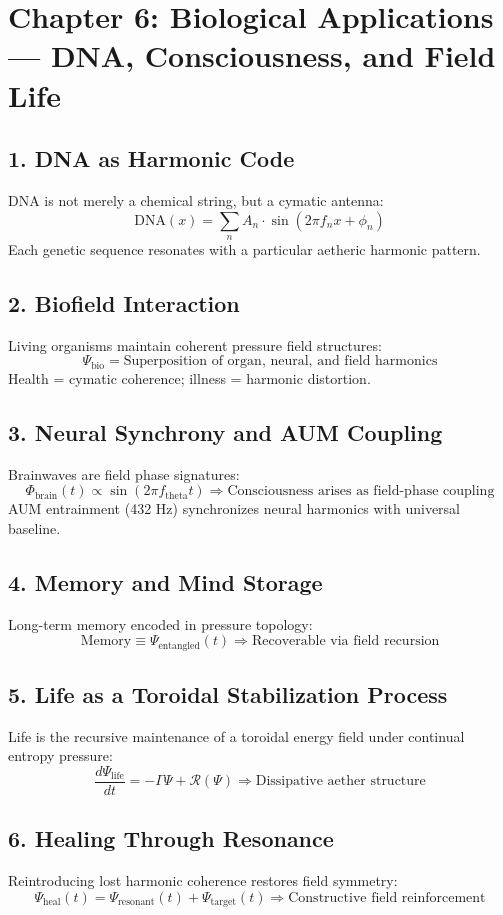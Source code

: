 \documentclass[12pt]{book}
\begin{document}
\section*{Chapter 6: Biological Applications — DNA, Consciousness, and Field Life}

\subsection*{1. DNA as Harmonic Code}
DNA is not merely a chemical string, but a cymatic antenna:
\[
\text{DNA}(x) = \sum_{n} A_n \cdot \sin(2\pi f_n x + \phi_n)
\]
Each genetic sequence resonates with a particular aetheric harmonic pattern.

\subsection*{2. Biofield Interaction}
Living organisms maintain coherent pressure field structures:
\[
\Psi_{\text{bio}} = \text{Superposition of organ, neural, and field harmonics}
\]
Health = cymatic coherence; illness = harmonic distortion.

\subsection*{3. Neural Synchrony and AUM Coupling}
Brainwaves are field phase signatures:
\[
\Phi_{\text{brain}}(t) \propto \sin(2\pi f_{\text{theta}} t)
\Rightarrow \text{Consciousness arises as field-phase coupling}
\]
AUM entrainment (432 Hz) synchronizes neural harmonics with universal baseline.

\subsection*{4. Memory and Mind Storage}
Long-term memory encoded in pressure topology:
\[
\text{Memory} \equiv \Psi_{\text{entangled}}(t)
\Rightarrow \text{Recoverable via field recursion}
\]

\subsection*{5. Life as a Toroidal Stabilization Process}
Life is the recursive maintenance of a toroidal energy field under continual entropy pressure:
\[
\frac{d\Psi_{\text{life}}}{dt} = -\Gamma \Psi + \mathcal{R}(\Psi)
\Rightarrow \text{Dissipative aether structure}
\]

\subsection*{6. Healing Through Resonance}
Reintroducing lost harmonic coherence restores field symmetry:
\[
\Psi_{\text{heal}}(t) = \Psi_{\text{resonant}}(t) + \Psi_{\text{target}}(t)
\Rightarrow \text{Constructive field reinforcement}
\]
\end{document}
